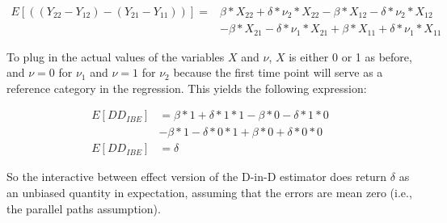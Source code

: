 \documentclass{article}
\begin{document}
\begin{align*}
E[((Y_{22} - Y_{12}) - (Y_{21} - Y_{11}))] =&  \beta*X_{22} + \delta * \nu_2 * X_{22} - \beta*X_{12} - \delta * \nu_2 * X_{12} \\ & -  \beta * X_{21} - \delta * \nu_1 * X_{21} + \beta * X_{11} + \delta * \nu_1 * X_{11}
\end{align*}

To plug in the actual values of the variables $X$ and $\nu$, $X$ is either 0 or 1 as before, and $\nu=0$ for $\nu_1$ and $\nu=1$ for $\nu_2$ because the first time point will serve as a reference category in the regression. This yields the following expression:

\begin{align*}
E[DD_{IBE}] &= \beta * 1 + \delta * 1 * 1 -  \beta * 0 - \delta * 1 * 0\\ &- \beta * 1 - \delta * 0 * 1 + \beta * 0 + \delta * 0 * 0 \\
E[DD_{IBE}] &= \delta
\end{align*}

So the interactive between effect version of the D-in-D estimator does return $\delta$ as an unbiased quantity in expectation, assuming that the errors are mean zero (i.e., the parallel paths assumption).
\end{document}
